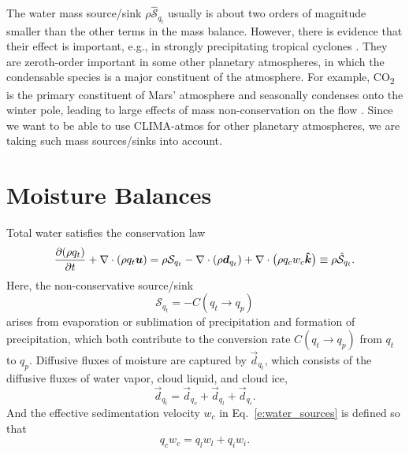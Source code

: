 \documentclass{report}
\begin{document}
The water mass source/sink $\rho \mathcal{\hat S}_{q_t}$ usually is about two orders of magnitude smaller than the other terms in the mass balance. However, there is evidence that their effect is important, e.g., in strongly precipitating tropical cyclones \citep{Qiu93a,Lackmann04a}. They are zeroth-order important in some other planetary atmospheres, in which the condensable species is a major constituent of the atmosphere. For example, CO\textsubscript{2} is the primary constituent of Mars' atmosphere and seasonally condenses onto the winter pole, leading to large effects of mass non-conservation on the flow \cite[e.g.,][]{Soto15a}. Since we want to be able to use CLIMA-atmos for other planetary atmospheres, we are taking such mass sources/sinks into account.

\section{Moisture Balances}\label{s:moisture_balance}

Total water satisfies the conservation law
\begin{equation}
\frac{\partial (\rho q_t)}{\partial t} + \nabla \cdot (\rho q_t \boldsymbol{{u}})
= \rho \mathcal{S}_{q_t} - \nabla \cdot (\rho \boldsymbol{{d}}_{q_t}) + \nabla \cdot \bigl(\rho q_c w_c \boldsymbol{{\hat k}}  \bigr)
\equiv \rho \mathcal{\hat S}_{q_t}.   
\label{e:governing_equations/moisture}
\end{equation}
Here, the non-conservative source/sink
\begin{equation}\label{e:water_sources}
     \mathcal{S}_{q_t} = - C(q_t \rightarrow q_p)
\end{equation}
arises from evaporation or sublimation of precipitation and formation of precipitation, which both contribute to the conversion rate $C(q_t \rightarrow q_p)$ from $q_t$ to $q_p$. Diffusive fluxes of moisture are captured by $\vec{d}_{q_t}$, which consists of the diffusive fluxes of water vapor, cloud liquid, and cloud ice, 
\begin{equation}
    \vec{d}_{q_t} =\vec{d}_{q_v} + \vec{d}_{q_l} + \vec{d}_{q_i}.
\end{equation}
And the effective sedimentation velocity $w_c$ in Eq.~\eqref{e:water_sources} is defined so that 
\begin{equation}
    q_c w_c = q_l w_l + q_i w_i.
\end{equation}
\end{document}
